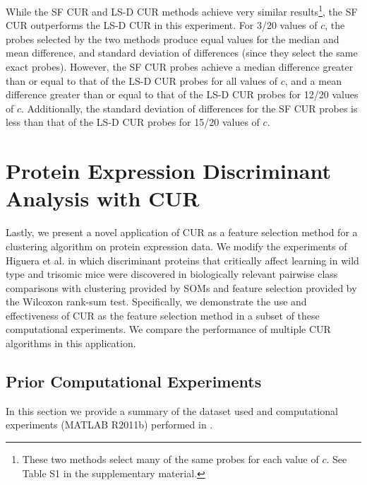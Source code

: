 \documentclass[12pt]{article}
\begin{document}
While the SF CUR and LS-D CUR methods achieve very similar results\footnote{These two methods select many of the same probes for each value of $c$.  See Table S1 in the supplementary material.}, the SF CUR outperforms the LS-D CUR in this experiment.  For 3/20 values of $c$, the probes selected by the two methods produce equal values for the median and mean difference, and standard deviation of differences (since they select the same exact probes). However, the SF CUR probes achieve a median difference greater than or equal to that of the LS-D CUR probes for all values of $c$, and a mean difference greater than or equal to that of the LS-D CUR probes for 12/20 values of $c$.  Additionally, the standard deviation of differences for the SF CUR probes is less than that of the LS-D CUR probes for 15/20 values of $c$.  
 
\section{Protein Expression Discriminant Analysis with CUR}
\label{sec:pro_exp}

Lastly, we present a novel application of CUR as a feature selection method for a clustering algorithm on protein expression data.  We modify the experiments of Higuera et al. \cite{higuera_et_al_2015} in which discriminant proteins that critically affect learning in wild type and trisomic mice were discovered in biologically relevant pairwise class comparisons with clustering provided by SOMs and feature selection provided by the Wilcoxon rank-sum test.  Specifically, we demonstrate the use and effectiveness of CUR as the feature selection method in a subset of these computational experiments.  We compare the performance of multiple CUR algorithms in this application.

\subsection{Prior Computational Experiments}
In this section we provide a summary of the dataset used and computational experiments (MATLAB R2011b) performed in \cite{higuera_et_al_2015}.  
\end{document}
